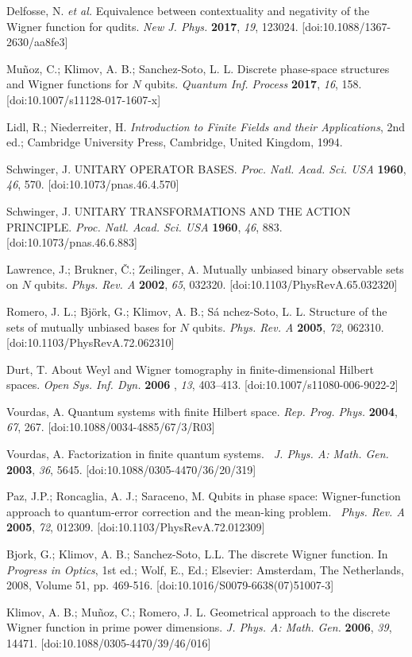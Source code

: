 \documentclass{article}
\begin{document}
\begin{thebibliography}{99}
 Delfosse, N. \textit{et al.} Equivalence between
contextuality and negativity of the Wigner function for qudits. \textit{New
J. Phys.} \textbf{2017}, \textit{19}, 123024. [doi:10.1088/1367-2630/aa8fe3]

 Mu\~noz, C.; Klimov, A. B.; Sanchez-Soto, L. L. Discrete
phase-space structures and Wigner functions for $N$ qubits. \textit{Quantum
Inf. Process} \textbf{2017}, \textit{16}, 158. [doi:10.1007/s11128-017-1607-x]

 Lidl, R.; Niederreiter, H. \textit{Introduction to Finite
Fields and their Applications}, 2nd ed.; Cambridge University Press,
Cambridge, United Kingdom, 1994.

 Schwinger, J. UNITARY OPERATOR BASES. \textit{Proc.
Natl. Acad. Sci. USA} \textbf{1960}, \textit{46}, 570.
[doi:10.1073/pnas.46.4.570]

 Schwinger, J. UNITARY TRANSFORMATIONS AND THE ACTION
PRINCIPLE. \textit{Proc. Natl. Acad. Sci. USA} \textbf{1960}, \textit{46},
883. [doi:10.1073/pnas.46.6.883]

 Lawrence, J.; Brukner, \v{C}.; Zeilinger, A. Mutually
unbiased binary observable sets on $N$ qubits. \textit{Phys. Rev. A} \textbf{%
2002}, \textit{65}, 032320. [doi:10.1103/PhysRevA.65.032320]

 Romero, J. L.; Bj\"{o}rk, G.; Klimov, A. B.; S\'{a}%
nchez-Soto, L. L. Structure of the sets of mutually unbiased bases for $N$
qubits. \textit{Phys. Rev. A} \textbf{2005}, \textit{72}, 062310.
[doi:10.1103/PhysRevA.72.062310]

 Durt, T. About Weyl and Wigner tomography in
finite-dimensional Hilbert spaces. \textit{Open Sys. Inf. Dyn.} \textbf{2006}%
, \textit{13}, 403--413. [doi:10.1007/s11080-006-9022-2]

 Vourdas, A. Quantum systems with finite Hilbert space. 
\textit{Rep. Prog. Phys.} \textbf{2004}, \textit{67}, 267.
[doi:10.1088/0034-4885/67/3/R03]

 Vourdas, A. Factorization in finite quantum systems. 
\textit{\ J. Phys. A: Math. Gen.} \textbf{2003}, \textit{36}, 5645.
[doi:10.1088/0305-4470/36/20/319]

 Paz, J.P.; Roncaglia, A. J.; Saraceno, M. Qubits in phase
space: Wigner-function approach to quantum-error correction and the
mean-king problem. \textit{\ Phys. Rev. A} \textbf{2005}, \textit{72},
012309. [doi:10.1103/PhysRevA.72.012309]

 Bjork, G.; Klimov, A. B.; Sanchez-Soto, L.L. The discrete
Wigner function. In \textit{Progress in Optics}, 1st ed.; Wolf, E., Ed.;
Elsevier: Amsterdam, The Netherlands, 2008, Volume 51, pp. 469-516.
[doi:10.1016/S0079-6638(07)51007-3]

 Klimov, A. B.; Mu\~{n}oz, C.; Romero, J. L. Geometrical
approach to the discrete Wigner function in prime power dimensions. \textit{%
J. Phys. A: Math. Gen.} \textbf{2006}, \textit{39}, 14471.
[doi:10.1088/0305-4470/39/46/016]
\end{thebibliography}
\end{document}
